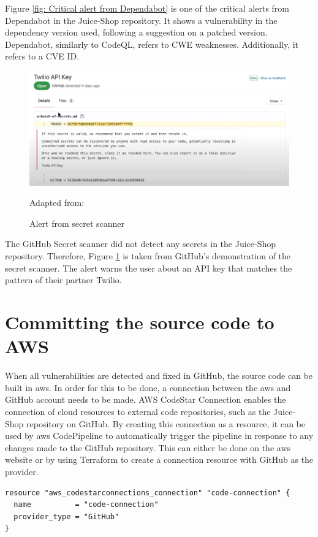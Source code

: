 Figure \ref{fig: Critical alert from Dependabot} is one of the critical alerts from Dependabot in the Juice-Shop repository. It shows a vulnerability in the dependency version used, following a suggestion on a patched version. Dependabot, similarly to CodeQL, refers to CWE weaknesses. Additionally, it refers to a CVE ID. 

\vspace{2mm}
\begin{figure}[H]
    \centering
    \includegraphics[width=0.8\columnwidth]{Images/secretscanneralert.png}
    \caption{Alert from secret scanner} Adapted from: \cite{GitHubVideo}
    \label{fig: Alert from secret scanner}
\end{figure}
The GitHub Secret scanner did not detect any secrets in the Juice-Shop repository. Therefore, Figure \ref{fig: Alert from secret scanner} is taken from GitHub's demonstration of the secret scanner. The alert warns the user about an API key that matches the pattern of their partner Twilio. 

\section{Committing the source code to AWS}
When all vulnerabilities are detected and fixed in GitHub, the source code can be built in \acrshort{aws}. In order for this to be done, a connection between the \acrshort{aws} and GitHub account needs to be made. AWS CodeStar Connection enables the connection of cloud resources to external code repositories, such as the Juice-Shop repository on GitHub. By creating this connection as a resource, it can be used by \acrshort{aws} CodePipeline to automatically trigger the pipeline in response to any changes made to the GitHub repository.
This can either be done on the \acrshort{aws} website or by using Terraform to create a connection resource with GitHub as the provider. 

\begin{tcolorbox}
\begin{verbatim}
resource "aws_codestarconnections_connection" "code-connection" {
  name          = "code-connection"
  provider_type = "GitHub"
}    
\end{verbatim}
\end{tcolorbox}

